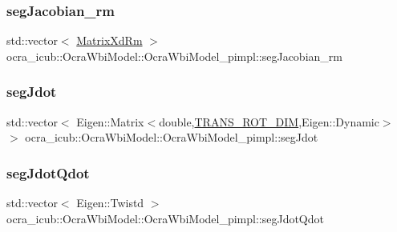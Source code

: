 \hypertarget{structOcraWbiModel_1_1OcraWbiModel__pimpl_a08c7db0bf6de072dc07a5810311aba48}{}\label{structOcraWbiModel_1_1OcraWbiModel__pimpl_a08c7db0bf6de072dc07a5810311aba48} 
\subsubsection{\texorpdfstring{seg\+Jacobian\+\_\+rm}{segJacobian\_rm}}
{\footnotesize\ttfamily std\+::vector$<$ \hyperlink{namespaceocra__icub_aa5e36a19ed031c28ca83c207bd7dd83f}{Matrix\+Xd\+Rm} $>$ ocra\+\_\+icub\+::\+Ocra\+Wbi\+Model\+::\+Ocra\+Wbi\+Model\+\_\+pimpl\+::seg\+Jacobian\+\_\+rm}

\hypertarget{structOcraWbiModel_1_1OcraWbiModel__pimpl_ab0371f4015f7abdf795636003e302de1}{}\label{structOcraWbiModel_1_1OcraWbiModel__pimpl_ab0371f4015f7abdf795636003e302de1} 
\subsubsection{\texorpdfstring{seg\+Jdot}{segJdot}}
{\footnotesize\ttfamily std\+::vector$<$ Eigen\+::\+Matrix$<$double,\hyperlink{OcraWbiModel_8cpp_ab4a87cb824ceff256c6b8bce7701af58}{T\+R\+A\+N\+S\+\_\+\+R\+O\+T\+\_\+\+D\+IM},Eigen\+::\+Dynamic$>$ $>$ ocra\+\_\+icub\+::\+Ocra\+Wbi\+Model\+::\+Ocra\+Wbi\+Model\+\_\+pimpl\+::seg\+Jdot}

\hypertarget{structOcraWbiModel_1_1OcraWbiModel__pimpl_aa8c16d833a534ce9975a10202aa145a3}{}\label{structOcraWbiModel_1_1OcraWbiModel__pimpl_aa8c16d833a534ce9975a10202aa145a3} 
\subsubsection{\texorpdfstring{seg\+Jdot\+Qdot}{segJdotQdot}}
{\footnotesize\ttfamily std\+::vector$<$ Eigen\+::\+Twistd $>$ ocra\+\_\+icub\+::\+Ocra\+Wbi\+Model\+::\+Ocra\+Wbi\+Model\+\_\+pimpl\+::seg\+Jdot\+Qdot}

